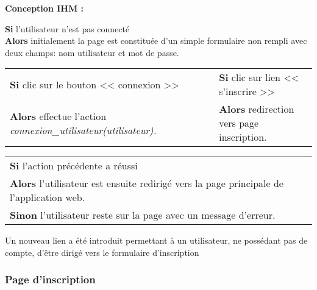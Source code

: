 			\begin{paragraphe}
				\textbf{Conception IHM :}
			\end{paragraphe}

			\begin{paragraphe}
				\textbf{Si} l'utilisateur n'est pas connecté \\
				\textbf{Alors} initialement la page est constituée d'un simple formulaire non rempli avec deux champs: nom utilisateur et mot de passe.
			\end{paragraphe}

            \begin{center}
                \begin{tabular}{l c | c l}
                    \textbf{Si} clic sur le bouton << connexion >> & & & \textbf{Si} clic sur lien  << s'inscrire >> \\
                    \textbf{Alors} effectue l'action \emph{connexion\_utilisateur(utilisateur).} & & & \textbf{Alors} redirection vers page inscription.
                \end{tabular}
            \end{center}

            \begin{center}
                \begin{tabular}{l}
                    \textbf{Si} l'action précédente a réussi \\
                    \textbf{Alors} l'utilisateur est ensuite redirigé vers la page principale de l'application web. \\
                    \textbf{Sinon} l'utilisateur reste sur la page avec un message d'erreur.
                \end{tabular}
            \end{center}


        \newpage
        
            \begin{paragraphe}
                Un nouveau lien a été introduit permettant à un utilisateur, ne possédant pas de compte, d'être dirigé vers le formulaire d'inscription
            \end{paragraphe}


    \clearpage

		\subsubsection{Page d'inscription}

